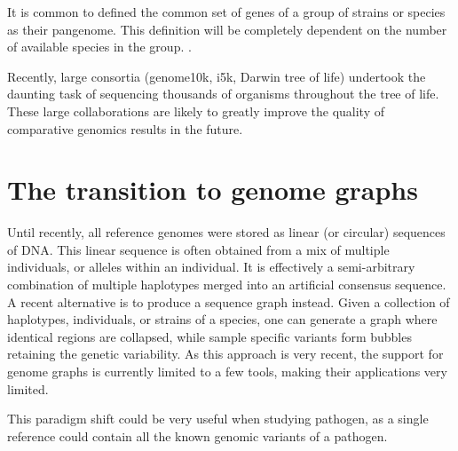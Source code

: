 It is common to defined the common set of genes of a group of strains or species as their pangenome. This definition will be completely dependent on the number of available species in the group. .

Recently, large consortia (genome10k, i5k, Darwin tree of life) undertook the daunting task of sequencing thousands of organisms throughout the tree of life. These large collaborations are likely to greatly improve the quality of comparative genomics results in the future.

\section{The transition to genome graphs}

Until recently, all reference genomes were stored as linear (or circular) sequences of DNA. This linear sequence is often obtained from a mix of multiple individuals, or alleles within an individual. It is effectively a semi-arbitrary combination of multiple haplotypes merged into an artificial consensus sequence. A recent alternative is to produce a sequence graph instead. Given a collection of haplotypes, individuals, or strains of a species, one can generate a graph where identical regions are collapsed, while sample specific variants form bubbles retaining the genetic variability. As this approach is very recent, the support for genome graphs is currently limited to a few tools, making their applications very limited.

This paradigm shift could be very useful when studying pathogen, as a single reference could contain all the known genomic variants of a pathogen.